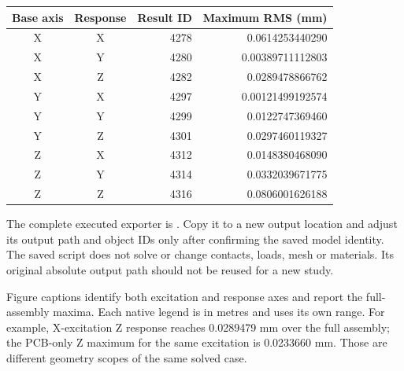 \documentclass[10pt,a4paper]{article}
\begin{document}
\begin{center}\small\begin{tabular}{c c r r}\toprule
Base axis & Response & Result ID & Maximum RMS (mm)\\\midrule
X&X&4278&0.0614253440290\\X&Y&4280&0.00389711112803\\X&Z&4282&0.0289478866762\\
Y&X&4297&0.00121499192574\\Y&Y&4299&0.0122747369460\\Y&Z&4301&0.0297460119327\\
Z&X&4312&0.0148380468090\\Z&Y&4314&0.0332039671775\\Z&Z&4316&0.0806001626188\\\bottomrule\end{tabular}\end{center}
The complete executed exporter is . Copy it to a new output location and adjust its output path and object IDs only after confirming the saved model identity. The saved script does not solve or change contacts, loads, mesh or materials. Its original absolute output path should not be reused for a new study.

Figure captions identify both excitation and response axes and report the full-assembly maxima. Each native legend is in metres and uses its own range. For example, X-excitation Z response reaches 0.0289479 mm over the full assembly; the PCB-only Z maximum for the same excitation is 0.0233660 mm. Those are different geometry scopes of the same solved case.
\end{document}
